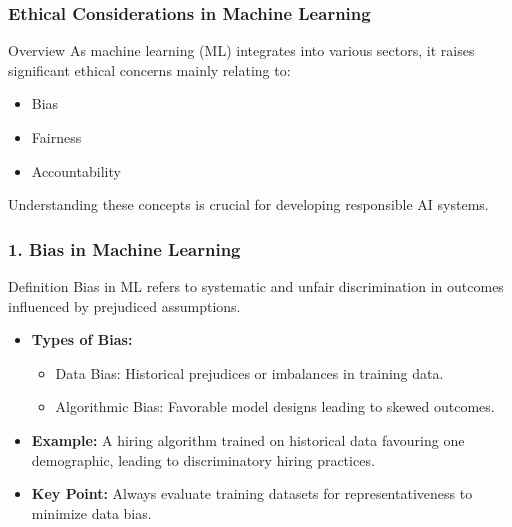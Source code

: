 \documentclass{beamer}
\begin{document}
\begin{frame}[fragile]
    \frametitle{Ethical Considerations in Machine Learning}
    \begin{block}{Overview}
        As machine learning (ML) integrates into various sectors, it raises significant ethical concerns mainly relating to:
        \begin{itemize}
            \item Bias
            \item Fairness
            \item Accountability
        \end{itemize}
        Understanding these concepts is crucial for developing responsible AI systems.
    \end{block}
\end{frame}

\begin{frame}[fragile]
    \frametitle{1. Bias in Machine Learning}
    \begin{block}{Definition}
        Bias in ML refers to systematic and unfair discrimination in outcomes influenced by prejudiced assumptions.
    \end{block}

    \begin{itemize}
        \item \textbf{Types of Bias:}
        \begin{itemize}
            \item Data Bias: Historical prejudices or imbalances in training data.
            \item Algorithmic Bias: Favorable model designs leading to skewed outcomes.
        \end{itemize}

        \item \textbf{Example:}
        A hiring algorithm trained on historical data favouring one demographic, leading to discriminatory hiring practices.

        \item \textbf{Key Point:}
        Always evaluate training datasets for representativeness to minimize data bias.
    \end{itemize}
\end{frame}
\end{document}

